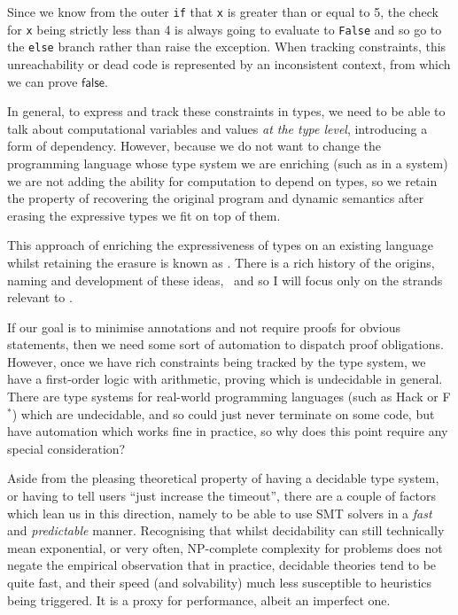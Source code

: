 Since we know from the outer \texttt{if} that \texttt{x} is
greater than or equal to 5, the check for \texttt{x} being strictly
less than 4 is always going to evaluate to \texttt{False} and so go to
the \texttt{else} branch rather than raise the exception. When tracking
constraints, this unreachability or dead code is represented by an inconsistent
context, from which we can prove $\mathsf{false}$.

In general, to express and track these constraints in types, we need to be able
to talk about computational variables and values \emph{at the type level},
introducing a form of dependency. However, because we do not want to change the
programming language whose type system we are enriching (such as in a
 system) we are not adding the ability for computation to
depend on types, so we retain the property of recovering the original program
and dynamic semantics after erasing the expressive types we fit on top of them.

This approach of enriching the expressiveness of types on an existing language
whilst retaining the erasure is known as . There is a
rich history of the origins, naming and development of these
ideas,~ and so I will focus only on the strands
relevant to .

If our goal is to minimise annotations and not require proofs for obvious
statements, then we need some sort of automation to dispatch proof
obligations. However, once we have rich constraints being tracked by the type
system, we have a first-order logic with arithmetic, proving which is
undecidable in general. There are type systems for real-world
programming languages (such as Hack or F$^*$) which are undecidable, and so
could just never terminate on some code, but have automation which works fine
in practice, so why does this point require any special consideration?

Aside from the pleasing theoretical property of having a decidable type system,
or having to tell users ``just increase the timeout'',  there are a couple of
factors which lean us in this direction, namely to be able to use SMT solvers
in a \emph{fast} and \emph{predictable} manner. Recognising that whilst
decidability can still technically mean exponential, or very often, NP-complete
complexity for problems does not negate the empirical observation that in
practice, decidable theories tend to be quite fast, and their speed (and
solvability) much less susceptible to heuristics being triggered. It is a proxy
for performance, albeit an imperfect one.

